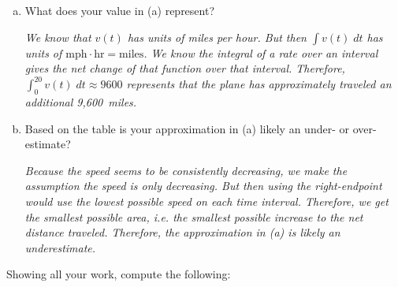 \documentclass[12pt,letterpaper]{exam}
\begin{document}
\begin{questions}
\begin{enumerate}[(a)]
\item What does your value in (a) represent? \pspace

	{\itshape We know that $v(t)$ has units of miles per hour. But then $\int v(t) \;dt$ has units of $\text{mph} \cdot \text{hr}= \text{miles}$. We know the integral of a rate over an interval gives the net change of that function over that interval. Therefore, $\displaystyle\int_0^{20} v(t) \;dt \approx 9600$ represents that the plane has approximately traveled an additional 9,600~miles.} \par\vspace{1.1cm}
	
\item Based on the table is your approximation in (a) likely an under- or over-estimate? \pspace
	
	{\itshape Because the speed seems to be consistently decreasing, we make the assumption the speed is only decreasing. But then using the right-endpoint would use the lowest possible speed on each time interval. Therefore, we get the smallest possible area, i.e. the smallest possible increase to the net distance traveled. Therefore, the approximation in (a) is likely an underestimate.}
\end{enumerate}



\newpage
\question Showing all your work, compute the following: \par\vspace{0.3cm}
\end{questions}
\end{document}
